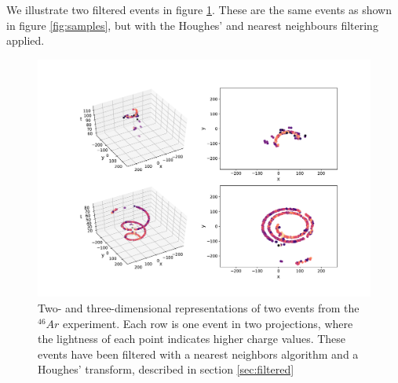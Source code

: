 We illustrate two filtered events in figure \ref{fig:samples_filtered}. These are the same events as shown in figure \ref{fig:samples}, but with the Houghes' and nearest neighbours filtering applied. 

\begin{figure}[H]
\centering
\includegraphics[width=\textwidth]{../plots/display_eventsclean_.pdf}
\caption[Displaying filtered events in 2D and 3D]{Two- and three-dimensional representations of two events from the ${}^{46}Ar$ experiment. Each row is one event in two projections, where the lightness of each point indicates higher charge values. These events have been filtered with a nearest neighbors algorithm and a Houghes' transform, described in section \ref{sec:filtered}}\label{fig:samples_filtered}
\end{figure}
